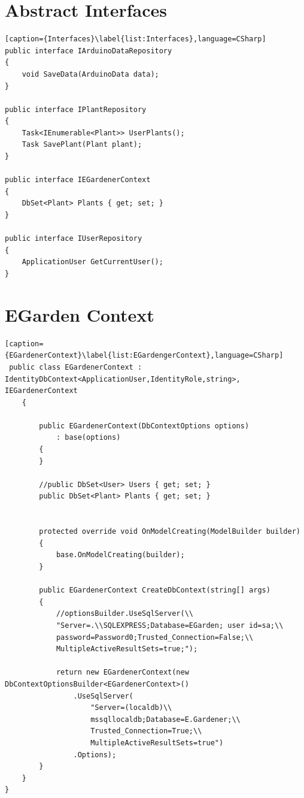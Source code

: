 \documentclass[a4paper,12pt,twoside,openright,titlepage]{book}
\begin{document}
\section{Abstract Interfaces}
\begin{lstlisting}[caption={Interfaces}\label{list:Interfaces},language=CSharp]
public interface IArduinoDataRepository
{
	void SaveData(ArduinoData data);
}

public interface IPlantRepository
{
	Task<IEnumerable<Plant>> UserPlants();
    Task SavePlant(Plant plant);
}

public interface IEGardenerContext
{
	DbSet<Plant> Plants { get; set; }
} 

public interface IUserRepository
{
	ApplicationUser GetCurrentUser();
}
\end{lstlisting}
\section{EGarden Context}
\begin{lstlisting}[caption={EGardenerContext}\label{list:EGardengerContext},language=CSharp]
 public class EGardenerContext : IdentityDbContext<ApplicationUser,IdentityRole,string>, IEGardenerContext
    {

        public EGardenerContext(DbContextOptions options)
            : base(options)
        {
        }

        //public DbSet<User> Users { get; set; }
        public DbSet<Plant> Plants { get; set; }


        protected override void OnModelCreating(ModelBuilder builder)
        {
            base.OnModelCreating(builder);
        }

        public EGardenerContext CreateDbContext(string[] args)
        {
            //optionsBuilder.UseSqlServer(\\
            "Server=.\\SQLEXPRESS;Database=EGarden; user id=sa;\\
            password=Password0;Trusted_Connection=False;\\
            MultipleActiveResultSets=true;");

            return new EGardenerContext(new DbContextOptionsBuilder<EGardenerContext>()
                .UseSqlServer(
                    "Server=(localdb)\\
                    mssqllocaldb;Database=E.Gardener;\\
                    Trusted_Connection=True;\\
                    MultipleActiveResultSets=true")
                .Options);
        }
    }
}

\end{lstlisting}
\end{document}
